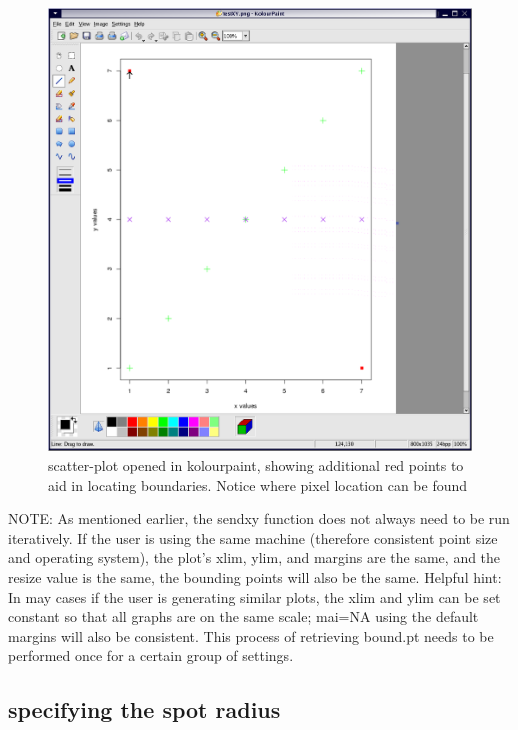 \documentclass[]{article}
\begin{document}
\begin{center}
\begin{figure}
\includegraphics{scatterPaint}
\caption{scatter-plot opened in kolourpaint, showing additional red points to aid in locating boundaries. Notice where pixel location can be found}
\end{figure}
\end{center}

NOTE: As mentioned earlier, the sendxy function does not always need to be run iteratively. If the user is using the same machine (therefore consistent point size and operating system), the plot's xlim, ylim, and margins are the same, and the resize value is the same, the bounding points will also be the same. Helpful hint:  In may cases if the user is generating similar plots, the xlim and ylim can be set constant so that all graphs are on the same scale; mai=NA using the default margins will also be consistent. This process of retrieving bound.pt needs to be performed once for a certain group of settings.\newline
\\


\subsection{specifying the spot radius}
\end{document}
